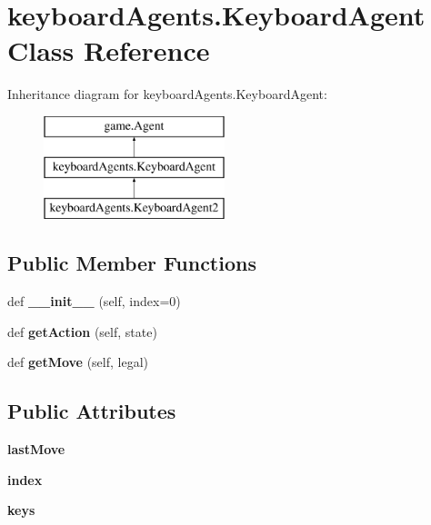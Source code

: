 \hypertarget{classkeyboard_agents_1_1_keyboard_agent}{}\section{keyboard\+Agents.\+Keyboard\+Agent Class Reference}
\label{classkeyboard_agents_1_1_keyboard_agent}
Inheritance diagram for keyboard\+Agents.\+Keyboard\+Agent\+:\begin{figure}[H]
\begin{center}
\leavevmode
\includegraphics[height=3.000000cm]{classkeyboard_agents_1_1_keyboard_agent}
\end{center}
\end{figure}
\subsection*{Public Member Functions}
\begin{DoxyCompactItemize}
\item 
\mbox{\label{classkeyboard_agents_1_1_keyboard_agent_a7f3e347791daf272729ef327c851a1d2}} 
def {\bfseries \+\_\+\+\_\+init\+\_\+\+\_\+} (self, index=0)
\item 
\mbox{\label{classkeyboard_agents_1_1_keyboard_agent_ab543dae39f1789b6e3977d8020a8b057}} 
def {\bfseries get\+Action} (self, state)
\item 
\mbox{\label{classkeyboard_agents_1_1_keyboard_agent_a7bfbb5a2ac852a82c1ec237e7a197567}} 
def {\bfseries get\+Move} (self, legal)
\end{DoxyCompactItemize}
\subsection*{Public Attributes}
\begin{DoxyCompactItemize}
\item 
\mbox{\label{classkeyboard_agents_1_1_keyboard_agent_a7565fe4c6dcd44fedae7679ad0ecd1b3}} 
{\bfseries last\+Move}
\item 
\mbox{\label{classkeyboard_agents_1_1_keyboard_agent_a176bc9b6f308dd362f0483cbe8973c2f}} 
{\bfseries index}
\item 
\mbox{\label{classkeyboard_agents_1_1_keyboard_agent_a5a5b9646d55b8c7f3ca5f94507750e94}} 
{\bfseries keys}
\end{DoxyCompactItemize}
